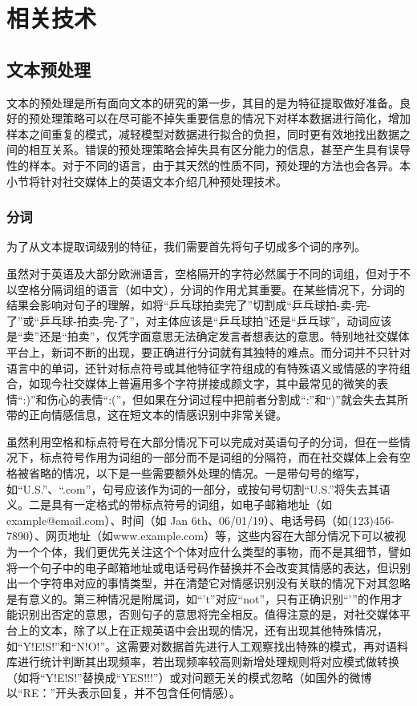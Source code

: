 \section{相关技术}
\label{sec:technology}

\subsection{文本预处理}
\label{ssec:text_preprocess}

文本的预处理是所有面向文本的研究的第一步，其目的是为特征提取做好准备。良好的预处理策略可以在尽可能不掉失重要信息的情况下对样本数据进行简化，增加样本之间重复的模式，减轻模型对数据进行拟合的负担，同时更有效地找出数据之间的相互关系。错误的预处理策略会掉失具有区分能力的信息，甚至产生具有误导性的样本。对于不同的语言，由于其天然的性质不同，预处理的方法也会各异。本小节将针对社交媒体上的英语文本介绍几种预处理技术。

\subsubsection{分词}
\label{sssec:tokenization}

为了从文本提取词级别的特征，我们需要首先将句子切成多个词的序列。

虽然对于英语及大部分欧洲语言，空格隔开的字符必然属于不同的词组，但对于不以空格分隔词组的语言（如中文），分词的作用尤其重要。在某些情况下，分词的结果会影响对句子的理解，如将“乒乓球拍卖完了”切割成“乒乓球拍-卖-完-了”或“乒乓球-拍卖-完-了”，对主体应该是“乒乓球拍”还是“乒乓球”，动词应该是“卖”还是“拍卖”，仅凭字面意思无法确定发言者想表达的意思。特别地社交媒体平台上，新词不断的出现，要正确进行分词就有其独特的难点。而分词并不只针对语言中的单词，还针对标点符号或其他特征字符组成的有特殊语义或情感的字符组合，如现今社交媒体上普遍用多个字符拼接成颜文字，其中最常见的微笑的表情“:)”和伤心的表情“:(”，但如果在分词过程中把前者分割成“:”和“)”就会失去其所带的正向情感信息，这在短文本的情感识别中非常关键。

虽然利用空格和标点符号在大部分情况下可以完成对英语句子的分词，但在一些情况下，标点符号作用为词组的一部分而不是词组的分隔符，而在社交媒体上会有空格被省略的情况，以下是一些需要额外处理的情况\cite{jackson2007natural}\cite{mitkov2004oxford}。一是带句号的缩写，如“U.S.”、“.com”，句号应该作为词的一部分，或按句号切割“U.S.”将失去其语义。二是具有一定格式的带标点符号的词组，如电子邮箱地址（如example@email.com）、时间（如 Jan 6th、06/01/19）、电话号码（如(123)456-7890）、网页地址（如www.example.com）等，这些内容在大部分情况下可以被视为一个个体，我们更优先关注这个个体对应什么类型的事物，而不是其细节，譬如将一个句子中的电子邮箱地址或电话号码作替换并不会改变其情感的表达，但识别出一个字符串对应的事情类型，并在清楚它对情感识别没有关联的情况下对其忽略是有意义的。第三种情况是附属词，如“'t”对应“not”，只有正确识别“'”的作用才能识别出否定的意思，否则句子的意思将完全相反。值得注意的是，对社交媒体平台上的文本，除了以上在正规英语中会出现的情况，还有出现其他特殊情况，如“Y!E!S!”和“N!O!”。这需要对数据首先进行人工观察找出特殊的模式，再对语料库进行统计判断其出现频率，若出现频率较高则新增处理规则将对应模式做转换（如将“Y!E!S!”替换成“YES!!!”）或对问题无关的模式忽略（如国外的微博以“RE：”开头表示回复，并不包含任何情感）。

